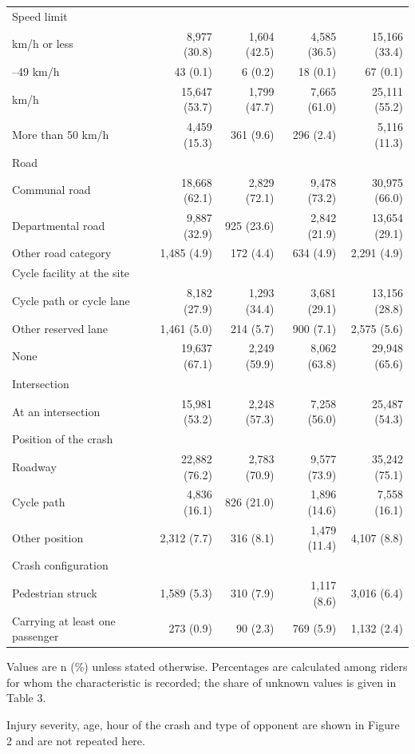 \begin{table}[tp]
\begin{threeparttable}
\begin{tabular}{lrrrr}
Speed limit &  &  &  &  \\
\quad 30 km/h or less & 8,977 (30.8) & 1,604 (42.5) & 4,585 (36.5) & 15,166 (33.4) \\
\quad 31–49 km/h & 43 (0.1) & 6 (0.2) & 18 (0.1) & 67 (0.1) \\
\quad 50 km/h & 15,647 (53.7) & 1,799 (47.7) & 7,665 (61.0) & 25,111 (55.2) \\
\quad More than 50 km/h & 4,459 (15.3) & 361 (9.6) & 296 (2.4) & 5,116 (11.3) \\
Road &  &  &  &  \\
\quad Communal road & 18,668 (62.1) & 2,829 (72.1) & 9,478 (73.2) & 30,975 (66.0) \\
\quad Departmental road & 9,887 (32.9) & 925 (23.6) & 2,842 (21.9) & 13,654 (29.1) \\
\quad Other road category & 1,485 (4.9) & 172 (4.4) & 634 (4.9) & 2,291 (4.9) \\
Cycle facility at the site &  &  &  &  \\
\quad Cycle path or cycle lane & 8,182 (27.9) & 1,293 (34.4) & 3,681 (29.1) & 13,156 (28.8) \\
\quad Other reserved lane & 1,461 (5.0) & 214 (5.7) & 900 (7.1) & 2,575 (5.6) \\
\quad None & 19,637 (67.1) & 2,249 (59.9) & 8,062 (63.8) & 29,948 (65.6) \\
Intersection &  &  &  &  \\
\quad At an intersection & 15,981 (53.2) & 2,248 (57.3) & 7,258 (56.0) & 25,487 (54.3) \\
Position of the crash &  &  &  &  \\
\quad Roadway & 22,882 (76.2) & 2,783 (70.9) & 9,577 (73.9) & 35,242 (75.1) \\
\quad Cycle path & 4,836 (16.1) & 826 (21.0) & 1,896 (14.6) & 7,558 (16.1) \\
\quad Other position & 2,312 (7.7) & 316 (8.1) & 1,479 (11.4) & 4,107 (8.8) \\
Crash configuration &  &  &  &  \\
\quad Pedestrian struck & 1,589 (5.3) & 310 (7.9) & 1,117 (8.6) & 3,016 (6.4) \\
\quad Carrying at least one passenger & 273 (0.9) & 90 (2.3) & 769 (5.9) & 1,132 (2.4) \\
\bottomrule
\end{tabular}
\begin{tablenotes}[flushleft]\footnotesize
\item Values are n (\%) unless stated otherwise. Percentages are calculated among riders for whom the characteristic is recorded; the share of unknown values is given in Table 3.
\item Injury severity, age, hour of the crash and type of opponent are shown in Figure 2 and are not repeated here.
\end{tablenotes}
\end{threeparttable}
\end{table}
